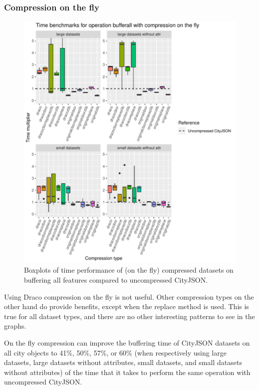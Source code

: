 \clearpage

\subsubsection{Compression on the fly}

\begin{figure}[h!]
    \includegraphics[scale=0.92]{figs/benchmark/individualotf/bufferall.pdf}
    \caption{Boxplots of time performance of (on the fly) compressed datasets on buffering all features compared to uncompressed CityJSON.}
    \label{figotf:sdvis}
\end{figure}

Using Draco compression on the fly is not useful.
Other compression types on the other hand do provide benefits, except when the replace method is used.
This is true for all dataset types, and there are no other interesting patterns to see in the graphs.


On the fly compression can improve the buffering time of CityJSON datasets on all city objects to 41\%, 50\%, 57\%, or 60\% (when respectively using large datasets, large datasets without attributes, small datasets, and small datasets without attributes) of the time that it takes to perform the same operation with uncompressed CityJSON.


